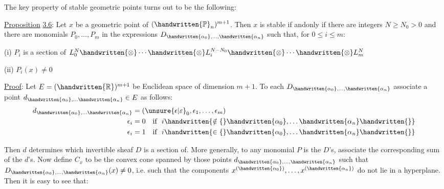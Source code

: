 
The key property of stable geometric points turns out to be the following:

\uline{Proposition} \uline{3.6}: Let $x$ be a geometric point of $(\handwritten{\mathbb P}_n)^{m+1}$. Then $x$ is stable if andonly if there are integers $N\geq N_0>0$ and there are monomials $P_0,\ldots,P_m$ in the expressions $D_{\handwritten{\alpha_0},\ldots,\handwritten{\alpha_n}}$ such that, for $0\leq i\leq m$:

(i) $P_i$ is a section of $L_0^N\handwritten{\otimes}\cdots\handwritten{\otimes}L_i^{N-N_0}\handwritten{\otimes}\cdots\handwritten{\otimes}L_m^N$

(ii) $P_i(x)\ne0$

\uline{Proof}: Let $E=(\handwritten{\mathbb R})^{m+1}$ be Euclidean space of dimension $m+1$. To each $D_{\handwritten{\alpha_0},\ldots,\handwritten{\alpha_n}}$ associate a point $d_{\handwritten{\alpha_0},\ldots\handwritten{\alpha_n}}\in E$ as follows:
\[
\begin{aligned}
d_{\handwritten{\alpha_0},\ldots\handwritten{\alpha_n}}&=(\unsure{\epsilon|\varepsilon}_0,\epsilon_1,\ldots,\epsilon_m)\\
\epsilon_i&=0\quad\text{if }\ i\handwritten{\notin\{}\handwritten{\alpha_0},\ldots\handwritten{\alpha_n}\handwritten{\}}\\
\epsilon_i&=1\quad\text{if }\ i\handwritten{\in\{}\handwritten{\alpha_0},\ldots\handwritten{\alpha_n}\handwritten{\}}
\end{aligned}
\]

Then $d$ determines which invertible sheaf $D$ is a section of. More generally, to any monomial $P$ is the $D$'s, associate the corresponding sum of the $d$'s. Now define $C_x$ to be the convex cone spanned by those points $d_{\handwritten{\alpha_0},\ldots,\handwritten{\alpha_n}}$ such that $D_{\handwritten{\alpha_0},\ldots,\handwritten{\alpha_n}}(x)\ne0$, i.e. such that the components $x^{(\handwritten{\alpha_0})},\ldots,x^{(\handwritten{\alpha_n})}$ do not lie in a hyperplane. Then it is easy to see that:

